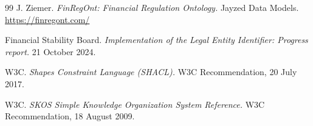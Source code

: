 \documentclass[11pt]{article}
\begin{document}
\begin{thebibliography}{99}
J. Ziemer.
\emph{FinRegOnt: Financial Regulation Ontology.}
Jayzed Data Models.
\url{https://finregont.com/}

Financial Stability Board.
\emph{Implementation of the Legal Entity Identifier: Progress report.}
21 October 2024.

W3C.
\emph{Shapes Constraint Language (SHACL).}
W3C Recommendation, 20 July 2017.

W3C.
\emph{SKOS Simple Knowledge Organization System Reference.}
W3C Recommendation, 18 August 2009.

\end{thebibliography}
\end{document}
